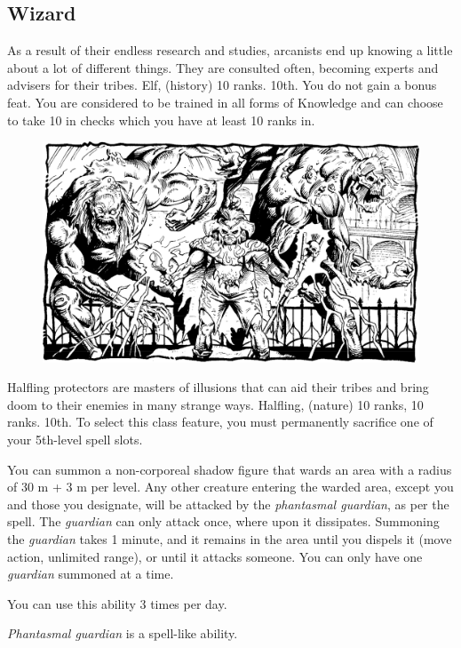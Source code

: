 \subsection{Wizard}
{As a result of their endless research and studies, arcanists end up knowing a little about a lot of different things. They are consulted often, becoming experts and advisers for their tribes.}
{Elf,  (history) 10 ranks.}
{10th.}
{You do not gain a bonus feat.}
{
	You are considered to be trained in all forms of Knowledge and can choose to take 10 in  checks which you have at least 10 ranks in.
}

\begin{figure}[t!]
\centering
\includegraphics[width=\textwidth]{images/necromancer-1.png}
\WOTC
\end{figure}
{Halfling protectors are masters of illusions that can aid their tribes and bring doom to their enemies in many strange ways.}
{Halfling,  (nature) 10 ranks,  10 ranks.}
{10th.}
{To select this class feature, you must permanently sacrifice one of your 5th-level spell slots.}
{
	You can summon a non-corporeal shadow figure that wards an area with a radius of 30 m + 3 m per level. Any other creature entering the warded area, except you and those you designate, will be attacked by the \emph{phantasmal guardian}, as per the  spell. The \emph{guardian} can only attack once, where upon it dissipates. Summoning the \emph{guardian} takes 1 minute, and it remains in the area until you dispels it (move action, unlimited range), or until it attacks someone. You can only have one \emph{guardian} summoned at a time.

	You can use this ability 3 times per day.

	\emph{Phantasmal guardian} is a spell-like ability.
}

